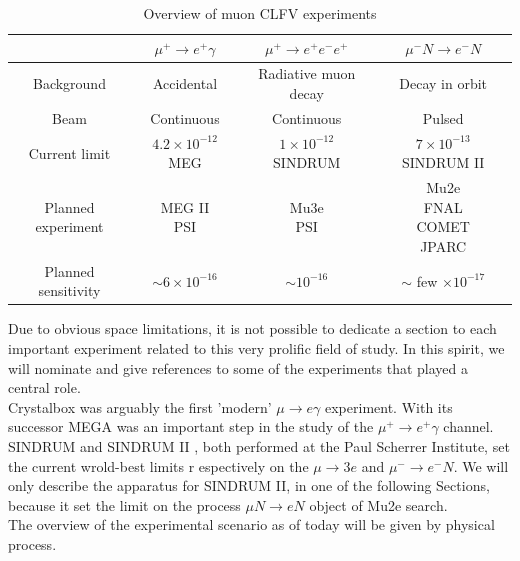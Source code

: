 \documentclass[12pt,a4paper,openright, oneside, titlepage]{book} %
\begin{document}
\begin{table}[!h]
\centering
\begin{tabular}{|c||c|c|c|}
\hline
& $\mu^+\rightarrow e^+\gamma$ & $\mu^+\rightarrow e^+e^-e^+$ & $\mu^- N \rightarrow e^- N$ \\
\hline \hline 
Background &
Accidental &
Radiative muon decay &
Decay in orbit \\
\hline
Beam &
Continuous &
Continuous &
Pulsed \\
\hline
Current limit &
\makecell{$4.2 \times 10^{-12}$ \\ MEG \cite{MEG}} &
\makecell{$1\times10^{-12}$ \\ SINDRUM \cite{SINDRUM}} & 
\makecell{$7\times10^{-13}$ \\ SINDRUM II \cite{SINDRUMII}} \\
\hline
Planned experiment &
\makecell{MEG II \\ PSI \cite{MEG_upgrade}\cite{MEG_II}\cite{Papa}}&
\makecell{Mu3e \\ PSI \cite{Mu3e:2014}\cite{Mu3e:2016}\cite{Papa}} &
\makecell{Mu2e \\ FNAL \cite{mu2e_proposal} \cite{MTDR}\\ COMET \\ JPARC\cite{COMET_2009}\cite{COMET_2012}\cite{COMET_2012_2}\cite{COMET_I}} \\
\hline
Planned sensitivity &
$\sim 6\times 10^{-16}$&
$\sim 10^{-16}$&
$\sim$ few $\times 10^{-17}$ \\
\hline
\end{tabular}
\caption{Overview of muon CLFV experiments}
\label{T_CLFV_mu}
\end{table}

\noindent Due to obvious space limitations, it is not possible
to dedicate a section to each important experiment related to this very prolific field of study. 
In this spirit, we will nominate and give references to some of the experiments that played a central role. \\
Crystalbox \cite{Crystalbox:1984} \cite{Crystalbox:1988} was arguably the first 'modern' $\mu\rightarrow e\gamma$ experiment. With its successor MEGA \cite{MEGA:1999} \cite{MEGA:2002} was an important step in the study of the $\mu^+\rightarrow e^+\gamma$ channel. SINDRUM \cite{SINDRUM} and SINDRUM II \cite{SINDRUMII}, 
both performed at the Paul Scherrer Institute, set the current wrold-best limits r
espectively on the $\mu \rightarrow 3 e$ and $\mu^-\rightarrow e^- N$. 
We will only describe the apparatus for SINDRUM II, in one of the following Sections, 
because it set the limit on the process $\mu N \rightarrow e N$ object of Mu2e search.\\
The overview of the experimental scenario as of today will be given by physical process.
\end{document}
